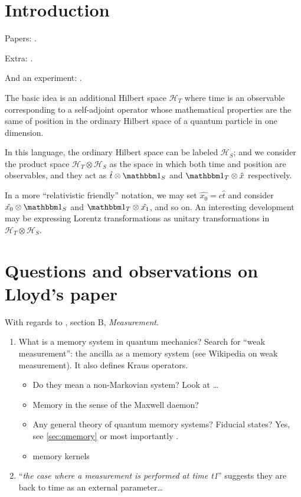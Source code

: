 \section{Introduction}

Papers: \cite{Lloyd:Time, Marletto:Evolution, Prvanovic, Maccone:Pauli}.

Extra: \cite{RealisticClocks, TimeAnyons}.

And an experiment: \cite{Moreva:synthetic,Moreva:illustration}.

The basic idea is an additional Hilbert space $\mathcal{H}_T$ where time is an observable
corresponding to
a self-adjoint operator whose mathematical properties are the same of position in the
ordinary Hilbert space of a quantum particle in one dimension.

In this language, the ordinary Hilbert space can be labeled $\mathcal{H}_S$;
and we consider the product space $\mathcal{H}_T \otimes \mathcal{H}_S$ as
the space in which both time and position are observables, and they act as
$\hat{t} \otimes \idop_S$ and $\idop_T \otimes \hat{x}$
respectively.

\begin{remark}
  In a more ``relativistic friendly'' notation, we may set
  $\hat{x_0} = c\hat{t}$ and consider
  $\hat{x_0} \otimes \idop_S$ and $\idop_T \otimes \hat{x_1}$,
  and so on. An interesting development may be expressing
  Lorentz transformations as unitary transformations in
  $\mathcal{H}_T \otimes \mathcal{H}_S$.
\end{remark}

\iftodo

\section{Questions and observations on Lloyd's paper}

With regards to \cite{Lloyd:Time}, section B, \textit{Measurement}.

\begin{enumerate}
  \item What is a memory system in quantum mechanics? Search for ``weak measurement'': the ancilla as a memory system (see Wikipedia on weak measurement). It also defines Kraus operators.
  \begin{itemize}
    \item Do they mean a non-Markovian system? Look at \cite{MeasurementMarkovian}\dots
    \item Memory in the sense of the Maxwell daemon?
    \item
      Any general theory of quantum memory systems? Fiducial states?
      Yes, see \ref{sec:qmemory} or most importantly \cite[Ch.~3]{PreskillNotes}.
    \item memory kernels \cite{CarmichaelOQS2017}
  \end{itemize}
  \item ``\emph{the case where a measurement is performed at time t1}'' suggests they are back to time as an external parameter\dots
\end{enumerate}

